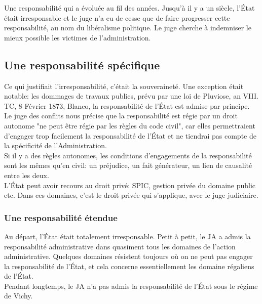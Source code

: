 \documentclass[10pt, a4paper, openany]{book}
\begin{document}
Une responsabilité qui a évoluée au fil des années. Jusqu'à il y a un siècle, l'État était irresponsable et le juge n'a eu de cesse que de faire progresser cette responsabilité, au nom du libéralisme politique. Le juge cherche à indemniser le mieux possible les victimes de l'administration. 

\subsection{Une responsabilité spécifique}

Ce qui justifiait l'irresponsabilité, c'était la souveraineté. Une exception était notable: les dommages de travaux publics, prévu par une loi de Pluviose, an VIII. \\
TC, 8 Février 1873, Blanco, la responsabilité de l'État est admise par principe. Le juge des conflits nous précise que la responsabilité est régie par un droit autonome "ne peut être régie par les règles du code civil", car elles permettraient d'engager trop facilement la responsabilité de l'État et ne tiendrai pas compte de la spécificité de l'Administration. \\
Si il y a des règles autonomes, les conditions d'engagements de la responsabilité sont les mêmes qu'en civil: un préjudice, un fait générateur, un lien de causalité entre les deux. \\
L'État peut avoir recours au droit privé: SPIC, gestion privée du domaine public etc. Dans ces domaines, c'est le droit privée qui s'applique, avec le juge judiciaire. 

\subsubsection{Une responsabilité étendue}

Au départ, l'État était totalement irresponsable. Petit à petit, le JA a admis la responsabilité administrative dans quasiment tous les domaines de l'action administrative. Quelques domaines résistent toujours où on ne peut pas engager la responsabilité de l'État, et cela concerne essentiellement les domaine régaliens de l'État. \\
Pendant longtemps, le JA n'a pas admis la responsabilité de l'État sous le régime de Vichy.
\end{document}
